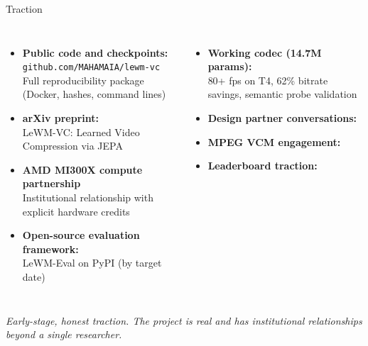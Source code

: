 \documentclass[aspectratio=169, professionalfonts, 10pt]{beamer}
\begin{document}
\begin{frame}{Traction}

  \begin{columns}[t]
    \begin{itemize}
      \item \textbf{Public code and checkpoints:} \\
            \texttt{github.com/MAHAMAIA/lewm-vc} \\
            Full reproducibility package (Docker, hashes, command lines)
      \item \textbf{arXiv preprint:} \\
            LeWM-VC: Learned Video Compression via JEPA
      \item \textbf{AMD MI300X compute partnership} \\
            Institutional relationship with explicit hardware credits
      \item \textbf{Open-source evaluation framework:} \\
            LeWM-Eval on PyPI (by target date)
    \end{itemize}

    \begin{itemize}
      \item \textbf{Working codec (14.7M params):} \\
            80+ fps on T4, 62\% bitrate savings, semantic probe validation
      \item \textbf{Design partner conversations:} \\
            [Name or category of LOI partner if signed]
      \item \textbf{MPEG VCM engagement:} \\
            [Observer or contribution status]
      \item \textbf{Leaderboard traction:} \\
            [X codecs evaluated on LeWM-Eval]
    \end{itemize}
  \end{columns}

  \vspace{1em}
  \begin{center}
    \textit{Early-stage, honest traction. The project is real and has institutional relationships beyond a single researcher.}
  \end{center}
\end{frame}
\end{document}
